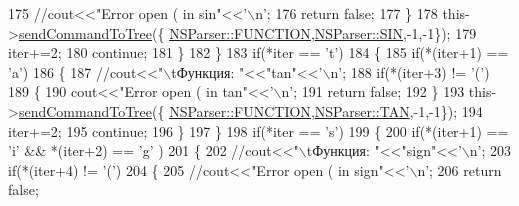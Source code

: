 \begin{DoxyCode}
175                              \textcolor{comment}{//cout<<"Error open ( in sin"<<'\(\backslash\)n';}
176                              \textcolor{keywordflow}{return} \textcolor{keyword}{false};
177                         \}
178                         this->\hyperlink{classParser_ac61a1fedefe50ed900f0e65c029053c1}{sendCommandToTree}(\{
      \hyperlink{namespaceNSParser_aca012df556c0413c6166348fdd62c4eba4adabba7d2f386bba54639075a582a36}{NSParser::FUNCTION},\hyperlink{namespaceNSParser_aae20df1402d72f463a1a9efe3ce1a9b9a27583ac72ebf80402125b171fafa8819}{NSParser::SIN},-1,-1\});
179                         iter+=2;
180                         \textcolor{keywordflow}{continue};
181                     \}
182                 \}
183                 \textcolor{keywordflow}{if}(*iter == \textcolor{charliteral}{'t'})
184                 \{
185                     \textcolor{keywordflow}{if}(*(iter+1) == \textcolor{charliteral}{'a'})
186                     \{
187                         \textcolor{comment}{//cout<<"\(\backslash\)tФункция: "<<"tan"<<'\(\backslash\)n';}
188                         \textcolor{keywordflow}{if}(*(iter+3) != \textcolor{charliteral}{'('})
189                         \{
190                             cout<<\textcolor{stringliteral}{"Error open ( in tan"}<<\textcolor{charliteral}{'\(\backslash\)n'};
191                             \textcolor{keywordflow}{return} \textcolor{keyword}{false};
192                         \}
193                         this->\hyperlink{classParser_ac61a1fedefe50ed900f0e65c029053c1}{sendCommandToTree}(\{
      \hyperlink{namespaceNSParser_aca012df556c0413c6166348fdd62c4eba4adabba7d2f386bba54639075a582a36}{NSParser::FUNCTION},\hyperlink{namespaceNSParser_aae20df1402d72f463a1a9efe3ce1a9b9a14eb2e9650d2c58c2f0a54ce8eb32792}{NSParser::TAN},-1,-1\});
194                         iter+=2;
195                         \textcolor{keywordflow}{continue};
196                     \}
197                 \}
198                 \textcolor{keywordflow}{if}(*iter == \textcolor{charliteral}{'s'})
199                 \{
200                     \textcolor{keywordflow}{if}(*(iter+1) == \textcolor{charliteral}{'i'} && *(iter+2) == \textcolor{charliteral}{'g'} )
201                     \{
202                         \textcolor{comment}{//cout<<"\(\backslash\)tФункция: "<<"sign"<<'\(\backslash\)n';}
203                         \textcolor{keywordflow}{if}(*(iter+4) != \textcolor{charliteral}{'('})
204                         \{
205                              \textcolor{comment}{//cout<<"Error open ( in sign"<<'\(\backslash\)n';}
206                              \textcolor{keywordflow}{return} \textcolor{keyword}{false};

\end{DoxyCode}
